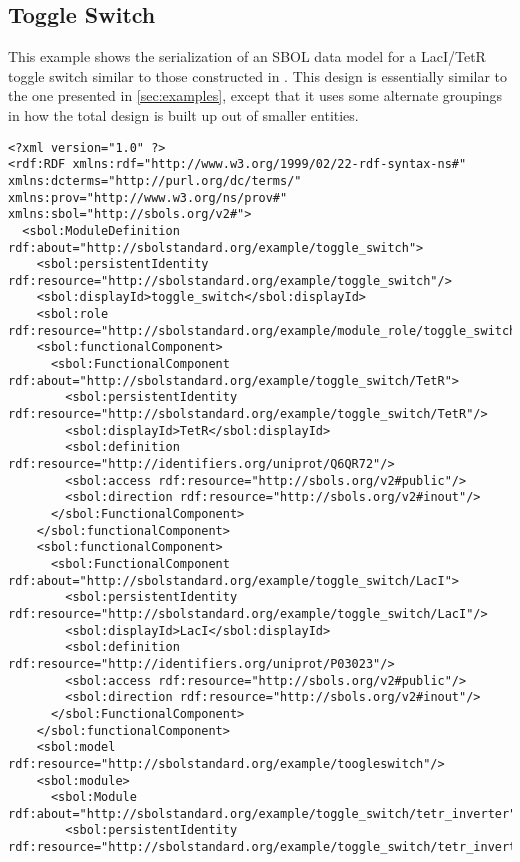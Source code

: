 \subsection{Toggle Switch}

This example shows the serialization of an SBOL data model for a LacI/TetR toggle switch similar to those constructed in \cite{Gardner2000}.  
This design is essentially similar to the one presented in \ref{sec:examples}, except that it uses some alternate groupings in how the total design is built up out of smaller entities.

\label{ser:toggleswitch}
\begin{lstlisting}
<?xml version="1.0" ?>
<rdf:RDF xmlns:rdf="http://www.w3.org/1999/02/22-rdf-syntax-ns#" xmlns:dcterms="http://purl.org/dc/terms/" xmlns:prov="http://www.w3.org/ns/prov#" xmlns:sbol="http://sbols.org/v2#">
  <sbol:ModuleDefinition rdf:about="http://sbolstandard.org/example/toggle_switch">
    <sbol:persistentIdentity rdf:resource="http://sbolstandard.org/example/toggle_switch"/>
    <sbol:displayId>toggle_switch</sbol:displayId>
    <sbol:role rdf:resource="http://sbolstandard.org/example/module_role/toggle_switch"/>
    <sbol:functionalComponent>
      <sbol:FunctionalComponent rdf:about="http://sbolstandard.org/example/toggle_switch/TetR">
        <sbol:persistentIdentity rdf:resource="http://sbolstandard.org/example/toggle_switch/TetR"/>
        <sbol:displayId>TetR</sbol:displayId>
        <sbol:definition rdf:resource="http://identifiers.org/uniprot/Q6QR72"/>
        <sbol:access rdf:resource="http://sbols.org/v2#public"/>
        <sbol:direction rdf:resource="http://sbols.org/v2#inout"/>
      </sbol:FunctionalComponent>
    </sbol:functionalComponent>
    <sbol:functionalComponent>
      <sbol:FunctionalComponent rdf:about="http://sbolstandard.org/example/toggle_switch/LacI">
        <sbol:persistentIdentity rdf:resource="http://sbolstandard.org/example/toggle_switch/LacI"/>
        <sbol:displayId>LacI</sbol:displayId>
        <sbol:definition rdf:resource="http://identifiers.org/uniprot/P03023"/>
        <sbol:access rdf:resource="http://sbols.org/v2#public"/>
        <sbol:direction rdf:resource="http://sbols.org/v2#inout"/>
      </sbol:FunctionalComponent>
    </sbol:functionalComponent>
    <sbol:model rdf:resource="http://sbolstandard.org/example/toogleswitch"/>
    <sbol:module>
      <sbol:Module rdf:about="http://sbolstandard.org/example/toggle_switch/tetr_inverter">
        <sbol:persistentIdentity rdf:resource="http://sbolstandard.org/example/toggle_switch/tetr_inverter"/>

\end{lstlisting}

